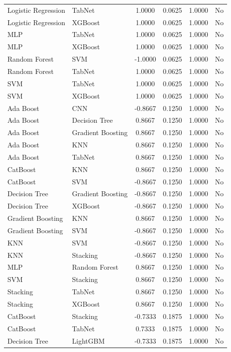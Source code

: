 \documentclass[a4paper,fleqn]{cas-sc}
\begin{document}
\begin{longtable}{l l c c c c}
Logistic Regression & TabNet & 1.0000 & 0.0625 & 1.0000 & No \\
Logistic Regression & XGBoost & 1.0000 & 0.0625 & 1.0000 & No \\
MLP & TabNet & 1.0000 & 0.0625 & 1.0000 & No \\
MLP & XGBoost & 1.0000 & 0.0625 & 1.0000 & No \\
Random Forest & SVM & -1.0000 & 0.0625 & 1.0000 & No \\
Random Forest & TabNet & 1.0000 & 0.0625 & 1.0000 & No \\
SVM & TabNet & 1.0000 & 0.0625 & 1.0000 & No \\
SVM & XGBoost & 1.0000 & 0.0625 & 1.0000 & No \\
Ada Boost & CNN & -0.8667 & 0.1250 & 1.0000 & No \\
Ada Boost & Decision Tree & 0.8667 & 0.1250 & 1.0000 & No \\
Ada Boost & Gradient Boosting & 0.8667 & 0.1250 & 1.0000 & No \\
Ada Boost & KNN & 0.8667 & 0.1250 & 1.0000 & No \\
Ada Boost & TabNet & 0.8667 & 0.1250 & 1.0000 & No \\
CatBoost & KNN & 0.8667 & 0.1250 & 1.0000 & No \\
CatBoost & SVM & -0.8667 & 0.1250 & 1.0000 & No \\
Decision Tree & Gradient Boosting & -0.8667 & 0.1250 & 1.0000 & No \\
Decision Tree & XGBoost & -0.8667 & 0.1250 & 1.0000 & No \\
Gradient Boosting & KNN & 0.8667 & 0.1250 & 1.0000 & No \\
Gradient Boosting & SVM & -0.8667 & 0.1250 & 1.0000 & No \\
KNN & SVM & -0.8667 & 0.1250 & 1.0000 & No \\
KNN & Stacking & -0.8667 & 0.1250 & 1.0000 & No \\
MLP & Random Forest & 0.8667 & 0.1250 & 1.0000 & No \\
SVM & Stacking & 0.8667 & 0.1250 & 1.0000 & No \\
Stacking & TabNet & 0.8667 & 0.1250 & 1.0000 & No \\
Stacking & XGBoost & 0.8667 & 0.1250 & 1.0000 & No \\
CatBoost & Stacking & -0.7333 & 0.1875 & 1.0000 & No \\
CatBoost & TabNet & 0.7333 & 0.1875 & 1.0000 & No \\
Decision Tree & LightGBM & -0.7333 & 0.1875 & 1.0000 & No \\

\end{longtable}
\end{document}
